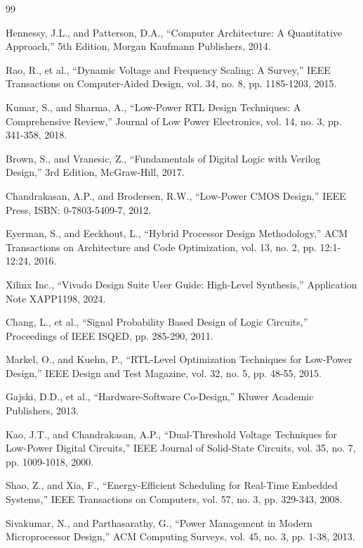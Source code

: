 \documentclass[15pt,a4paper]{report}
\begin{document}
\begin{thebibliography}{99}

Hennessy, J.L., and Patterson, D.A., ``Computer Architecture: A Quantitative Approach,'' 5th Edition, Morgan Kaufmann Publishers, 2014.

Rao, R., et al., ``Dynamic Voltage and Frequency Scaling: A Survey,'' IEEE Transactions on Computer-Aided Design, vol. 34, no. 8, pp. 1185-1203, 2015.

Kumar, S., and Sharma, A., ``Low-Power RTL Design Techniques: A Comprehensive Review,'' Journal of Low Power Electronics, vol. 14, no. 3, pp. 341-358, 2018.

Brown, S., and Vranesic, Z., ``Fundamentals of Digital Logic with Verilog Design,'' 3rd Edition, McGraw-Hill, 2017.

Chandrakasan, A.P., and Brodersen, R.W., ``Low-Power CMOS Design,'' IEEE Press, ISBN: 0-7803-5409-7, 2012.

Eyerman, S., and Eeckhout, L., ``Hybrid Processor Design Methodology,'' ACM Transactions on Architecture and Code Optimization, vol. 13, no. 2, pp. 12:1-12:24, 2016.

Xilinx Inc., ``Vivado Design Suite User Guide: High-Level Synthesis,'' Application Note XAPP1198, 2024.

Chang, L., et al., ``Signal Probability Based Design of Logic Circuits,'' Proceedings of IEEE ISQED, pp. 285-290, 2011.

Markel, O., and Kuehn, P., ``RTL-Level Optimization Techniques for Low-Power Design,'' IEEE Design and Test Magazine, vol. 32, no. 5, pp. 48-55, 2015.

Gajski, D.D., et al., ``Hardware-Software Co-Design,'' Kluwer Academic Publishers, 2013.

Kao, J.T., and Chandrakasan, A.P., ``Dual-Threshold Voltage Techniques for Low-Power Digital Circuits,'' IEEE Journal of Solid-State Circuits, vol. 35, no. 7, pp. 1009-1018, 2000.

Shao, Z., and Xia, F., ``Energy-Efficient Scheduling for Real-Time Embedded Systems,'' IEEE Transactions on Computers, vol. 57, no. 3, pp. 329-343, 2008.

Sivakumar, N., and Parthasarathy, G., ``Power Management in Modern Microprocessor Design,'' ACM Computing Surveys, vol. 45, no. 3, pp. 1-38, 2013.


\end{thebibliography}
\end{document}
